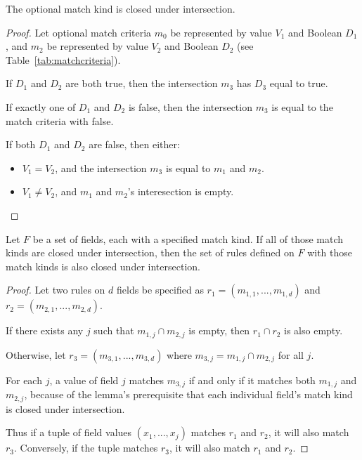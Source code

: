 \documentclass[acmsmall]{acmart}
\begin{document}
\begin{lemma}
\label{lem:optionalmatchclosedunderintersection}
The optional match kind is closed under intersection.
\end{lemma}

\begin{proof}
Let optional match criteria $m_0$
be represented by value $V_1$ and Boolean $D_1$,
and $m_2$
be represented by value $V_2$ and Boolean $D_2$
(see Table~\ref{tab:matchcriteria}).

If $D_1$ and $D_2$ are both true,
then the intersection $m_3$ has $D_3$ equal to true.

If exactly one of $D_1$ and $D_2$ is false,
then the intersection $m_3$
is equal to the match criteria with false.

If both $D_1$ and $D_2$ are false,
then either:
\begin{itemize}
\item $V_1 = V_2$, and the intersection $m_3$
  is equal to $m_1$ and $m_2$.
\item $V_1 \neq V_2$, and $m_1$ and $m_2$'s interesection is empty.
\end{itemize}
\end{proof}

\begin{lemma}
\label{lem:rulesclosedunderintersection}
Let $F$ be a set of fields, each with a specified match kind.
If all of those match kinds are closed under intersection,
then the set of rules defined on $F$ with those match kinds
is also closed under intersection.
\end{lemma}

\begin{proof}
Let two rules on $d$ fields be specified as
$r_1 = (m_{1,1}, ..., m_{1,d})$
and
$r_2 = (m_{2,1}, ..., m_{2,d})$.

If there exists any $j$ such that $m_{1,j} \cap m_{2,j}$
is empty, then $r_1 \cap r_2$ is also empty.

Otherwise, let
$r_3 = (m_{3,1}, ..., m_{3,d})$
where $m_{3,j} = m_{1,j} \cap m_{2,j}$ for all $j$.

For each $j$, a value of field $j$ matches $m_{3,j}$
if and only if it matches both $m_{1,j}$ and $m_{2,j}$,
because of the lemma's prerequisite that each individual
field's match kind is closed under intersection.

Thus if a tuple of field values $(x_1, ..., x_j)$
matches $r_1$ and $r_2$, it will also match $r_3$.
Conversely, if the tuple matches $r_3$, it will also
match $r_1$ and $r_2$.
\end{proof}
\end{document}
